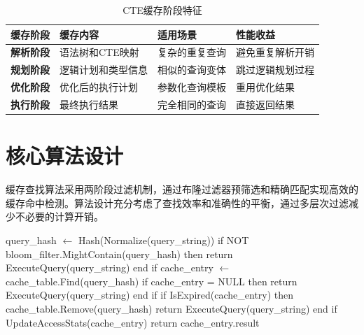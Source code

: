 \begin{table}[!htb]
    \caption{CTE缓存阶段特征}
    \label{table3_2}
    \centering
    \begin{tabular}{p{2cm}p{4cm}p{3.5cm}p{4cm}}
        \hline
        缓存阶段 & 缓存内容 & 适用场景 & 性能收益 \\
        \hline
        \textbf{解析阶段} & 语法树和CTE映射 & 复杂的重复查询 & 避免重复解析开销 \\
        \textbf{规划阶段} & 逻辑计划和类型信息 & 相似的查询变体 & 跳过逻辑规划过程 \\
        \textbf{优化阶段} & 优化后的执行计划 & 参数化查询模板 & 重用优化结果 \\
        \textbf{执行阶段} & 最终执行结果 & 完全相同的查询 & 直接返回结果 \\
        \hline
    \end{tabular}
\end{table}

\section{核心算法设计}

缓存查找算法采用两阶段过滤机制，通过布隆过滤器预筛选和精确匹配实现高效的缓存命中检测。算法设计充分考虑了查找效率和准确性的平衡，通过多层次过滤减少不必要的计算开销。

\begin{algorithm}[H]
\caption{缓存查找算法}
\label{alg3_3_1}
\begin{algorithmic}[1]
\STATE query\_hash $\leftarrow$ Hash(Normalize(query\_string)) 
\STATE if NOT bloom\_filter.MightContain(query\_hash) then 
\STATE return ExecuteQuery(query\_string) 
\STATE end if
\STATE 
\STATE cache\_entry $\leftarrow$ cache\_table.Find(query\_hash) 
\STATE if cache\_entry = NULL then 
\STATE return ExecuteQuery(query\_string) 
\STATE end if
\STATE 
\STATE if IsExpired(cache\_entry) then 
\STATE cache\_table.Remove(query\_hash) 
\STATE return ExecuteQuery(query\_string) 
\STATE end if
\STATE 
\STATE UpdateAccessStats(cache\_entry) 
\STATE return cache\_entry.result 
\end{algorithmic}
\end{algorithm}

